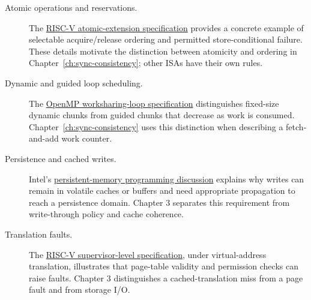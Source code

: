 \begin{description}
  \item[Atomic operations and reservations.] The \href{https://docs.riscv.org/reference/isa/unpriv/a-st-ext.html}{RISC-V atomic-extension specification} provides a concrete example of selectable acquire/release ordering and permitted store-conditional failure. These details motivate the distinction between atomicity and ordering in Chapter~\ref{ch:sync-consistency}; other ISAs have their own rules.
  \item[Dynamic and guided loop scheduling.] The \href{https://www.openmp.org/spec-html/5.2/openmpse66.html}{OpenMP worksharing-loop specification} distinguishes fixed-size dynamic chunks from guided chunks that decrease as work is consumed. Chapter~\ref{ch:sync-consistency} uses this distinction when describing a fetch-and-add work counter.
  \item[Persistence and cached writes.] Intel's \href{https://www.intel.com/content/www/us/en/developer/articles/technical/enabling-persistent-memory-in-the-storage-performance-development-kit-spdk.html}{persistent-memory programming discussion} explains why writes can remain in volatile caches or buffers and need appropriate propagation to reach a persistence domain. Chapter 3 separates this requirement from write-through policy and cache coherence.
  \item[Translation faults.] The \href{https://docs.riscv.org/reference/isa/priv/supervisor.html}{RISC-V supervisor-level specification}, under virtual-address translation, illustrates that page-table validity and permission checks can raise faults. Chapter 3 distinguishes a cached-translation miss from a page fault and from storage I/O.
\end{description}
